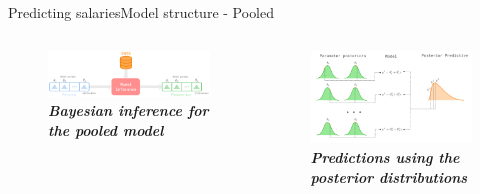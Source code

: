 \documentclass[aspectratio=169, xcolor=dvipsnames]{beamer}
\begin{document}
\begin{frame}{Predicting salaries}{Model structure - Pooled}
    \vspace*{-30pt}
    \begin{columns}
            \begin{figure}
                \centering
                \includegraphics[width=1.0\textwidth]{./images/pooled.png}
                \captionsetup{labelformat=empty}
                \setlength{\abovecaptionskip}{-5pt}
                \caption{\fontsize{8pt}{8pt}\selectfont \textbf{\textit{Bayesian inference for the pooled model}}}
            \end{figure}
            \begin{figure}
                \centering
                \includegraphics[width=1.0\textwidth]{./images/posterior_pred.png}
                \captionsetup{labelformat=empty}
                \setlength{\abovecaptionskip}{-5pt}
                \caption{\fontsize{8pt}{8pt}\selectfont \textbf{\textit{Predictions using the posterior distributions}}}
            \end{figure}
    \end{columns}
\end{frame}
\end{document}
